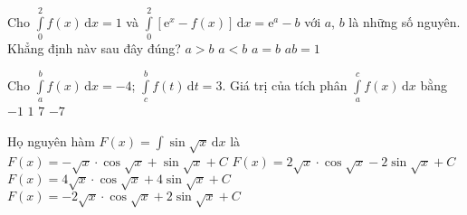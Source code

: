 \begin{ex}%
Cho $\displaystyle\int\limits_0^2 f(x)\mathrm{\,d}x=1$ và $\displaystyle\int\limits_0^2\left[\mathrm{e}^x-f(x)\right]\mathrm{\,d}x=\mathrm{e}^a-b$ với $a$, $b$ là những số nguyên. Khẳng định nàv sau đây đúng?
\choice
{$a>b$}
{$a<b$}
{\True $a=b$}
{$ab=1$}
\end{ex}

\begin{ex}%
Cho $\displaystyle\int\limits_{a}^{b}f(x)\mathrm{\, d}x=-4$; $\displaystyle\int\limits_{c}^{b}f(t)\mathrm{\, d}t=3$. Giá trị của tích phân $\displaystyle\int\limits_{a}^{c}f(x)\mathrm{\, d}x$ bằng
\choice
{$-1$}
{$1$}
{$7$}
{\True $-7$}
\end{ex}

\begin{ex}%
Họ nguyên hàm $F(x)=\displaystyle\int\sin\sqrt{x}\mathrm{\,d}x$ là
\choice
{$F(x)=-\sqrt{x}\cdot\cos\sqrt{x}+\sin\sqrt{x}+C$}
{$F(x)=2\sqrt{x}\cdot\cos\sqrt{x}-2\sin\sqrt{x}+C$}
{$F(x)=4\sqrt{x}\cdot\cos\sqrt{x}+4\sin\sqrt{x}+C$}
{\True $F(x)=-2\sqrt{x}\cdot\cos\sqrt{x}+2\sin\sqrt{x}+C$}
\end{ex}

